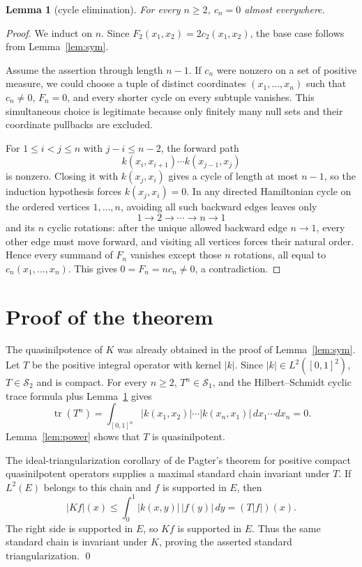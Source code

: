 \documentclass[11pt]{article}
\newtheorem{lemma}[theorem]{Lemma}
\newcommand{\Sone}{\mathcal S_1}
\newcommand{\Stwo}{\mathcal S_2}
\newcommand{\tr}{\operatorname{tr}}
\begin{document}
\begin{lemma}[cycle elimination]\label{lem:cycles}
For every $n\geq2$, $c_n=0$ almost everywhere.
\end{lemma}

\begin{proof}
We induct on $n$.  Since
$F_2(x_1,x_2)=2c_2(x_1,x_2)$, the base case follows from
Lemma~\ref{lem:sym}.

Assume the assertion through length $n-1$.  If $c_n$ were nonzero on a set
of positive measure, we could choose a tuple of distinct coordinates
$(x_1,\ldots,x_n)$ such that $c_n\ne0$, $F_n=0$, and every shorter cycle on
every subtuple vanishes.  This simultaneous choice is legitimate because
only finitely many null sets and their coordinate pullbacks are excluded.

For $1\leq i<j\leq n$ with $j-i\leq n-2$, the forward path
\[
 k(x_i,x_{i+1})\cdots k(x_{j-1},x_j)
\]
is nonzero.  Closing it with $k(x_j,x_i)$ gives a cycle of length at most
$n-1$, so the induction hypothesis forces $k(x_j,x_i)=0$.  In any directed
Hamiltonian cycle on the ordered vertices $1,\ldots,n$, avoiding all such
backward edges leaves only
\[
 1\to2\to\cdots\to n\to1
\]
and its $n$ cyclic rotations: after the unique allowed backward edge
$n\to1$, every other edge must move forward, and visiting all vertices
forces their natural order.  Hence every summand of $F_n$ vanishes except
those $n$ rotations, all equal to $c_n(x_1,\ldots,x_n)$.  This gives
$0=F_n=n c_n\ne0$, a contradiction.
\end{proof}

\section*{Proof of the theorem}

The quasinilpotence of $K$ was already obtained in the proof of
Lemma~\ref{lem:sym}.  Let $T$ be the positive integral operator with kernel
$|k|$.  Since $|k|\in L^2([0,1]^2)$, $T\in\Stwo$ and is compact.  For every
$n\geq2$, $T^n\in\Sone$, and the Hilbert--Schmidt cyclic trace formula plus
Lemma~\ref{lem:cycles} gives
\[
 \tr(T^n)=\int_{[0,1]^n}
 |k(x_1,x_2)|\cdots|k(x_n,x_1)|\,dx_1\cdots dx_n=0.
\]
Lemma~\ref{lem:power} shows that $T$ is quasinilpotent.

The ideal-triangularization corollary of de Pagter's theorem for positive
compact quasinilpotent operators \cite{dePagter,RadjaviRosenthal} supplies a
maximal standard chain invariant under $T$.  If $L^2(E)$ belongs to this
chain and $f$ is supported in $E$, then
\[
 |Kf|(x)\leq\int_0^1|k(x,y)|\,|f(y)|\,dy=(T|f|)(x).
\]
The right side is supported in $E$, so $Kf$ is supported in $E$.  Thus the
same standard chain is invariant under $K$, proving the asserted standard
triangularization.  \qed
\end{document}
